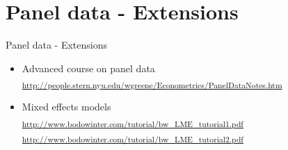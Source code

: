 \documentclass[usenames,dvipsnames]{beamer}
\begin{document}
\section{Panel data - Extensions}
\begin{frame}{Panel data - Extensions}
\begin{itemize}
\item Advanced course on panel data \\
\textsubscript{\textcolor{Blue}{\url{http://people.stern.nyu.edu/wgreene/Econometrics/PanelDataNotes.htm}} }
\bigskip
\item Mixed effects models \\
\textsubscript{ \textcolor{Blue}{\url{http://www.bodowinter.com/tutorial/bw_LME_tutorial1.pdf}} } \\
\medskip
\textsubscript{ \textcolor{Blue}{\url{http://www.bodowinter.com/tutorial/bw_LME_tutorial2.pdf}} } \\
\end{itemize}
\end{frame}
\end{document}

